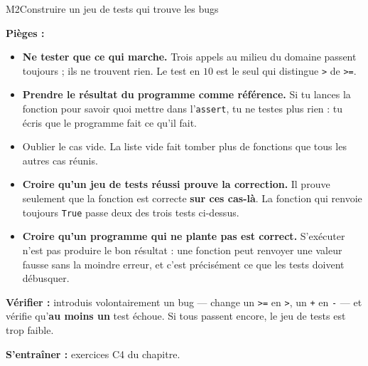 \begin{fichemethode}{M2}{Construire un jeu de tests qui trouve les bugs}

\textbf{Pièges :}
\begin{itemize}
  \item \textbf{Ne tester que ce qui marche.} Trois appels au milieu du domaine passent
    toujours ; ils ne trouvent rien. Le test en $10$ est le seul qui distingue
    \lstinline{>} de \lstinline{>=}.
  \item \textbf{Prendre le résultat du programme comme référence.} Si tu lances la fonction
    pour savoir quoi mettre dans l'\lstinline{assert}, tu ne testes plus rien : tu écris que
    le programme fait ce qu'il fait.
  \item Oublier le cas vide. La liste vide fait tomber plus de fonctions que tous les autres
    cas réunis.
  \item \textbf{Croire qu'un jeu de tests réussi prouve la correction.} Il prouve seulement
    que la fonction est correcte \textbf{sur ces cas-là}. La fonction qui renvoie toujours
    \lstinline{True} passe deux des trois tests ci-dessus.
  \item \textbf{Croire qu'un programme qui ne plante pas est correct.} S'exécuter n'est pas
    produire le bon résultat : une fonction peut renvoyer une valeur fausse sans la moindre
    erreur, et c'est précisément ce que les tests doivent débusquer.
\end{itemize}

\textbf{Vérifier :} introduis volontairement un bug — change un \lstinline{>=} en
\lstinline{>}, un \lstinline{+} en \lstinline{-} — et vérifie qu'\textbf{au moins un} test
échoue. Si tous passent encore, le jeu de tests est trop faible.

\textbf{S'entraîner :} exercices C4 du chapitre.
\end{fichemethode}
